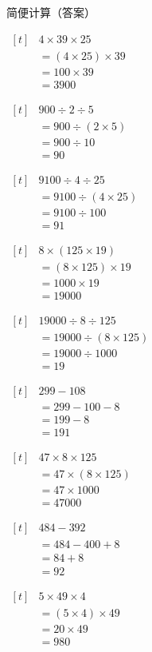 \documentclass[UTF8]{ctexart}
\newcommand{\sheettitle}[1]{%
  \begin{center}
    {\zihao{1} #1\par}
  \end{center}
  \vspace{8mm}%
}
\newcommand{\cell}[1]{%
  \begin{minipage}[t][49mm][t]{0.315\textwidth}%
    \vspace{0pt}%
    \linespread{1}\zihao{3}%
    #1%
  \end{minipage}%
}
\newcommand{\sheetrow}[3]{%
  \noindent\cell{#1}\hfill\cell{#2}\hfill\cell{#3}\par
  \nointerlineskip
}
\begin{document}
\sheettitle{简便计算（答案）}
\sheetrow
{\(\begin{aligned}[t]
& 4\times 39\times 25 \\
& = (4\times 25)\times 39 \\
& = 100\times 39 \\
& = 3900
\end{aligned}\)}
{\(\begin{aligned}[t]
& 900\div 2\div 5 \\
& = 900\div (2\times 5) \\
& = 900\div 10 \\
& = 90
\end{aligned}\)}
{\(\begin{aligned}[t]
& 9100\div 4\div 25 \\
& = 9100\div (4\times 25) \\
& = 9100\div 100 \\
& = 91
\end{aligned}\)}
\sheetrow
{\(\begin{aligned}[t]
& 8\times (125\times 19) \\
& = (8\times 125)\times 19 \\
& = 1000\times 19 \\
& = 19000
\end{aligned}\)}
{\(\begin{aligned}[t]
& 19000\div 8\div 125 \\
& = 19000\div (8\times 125) \\
& = 19000\div 1000 \\
& = 19
\end{aligned}\)}
{\(\begin{aligned}[t]
& 299-108 \\
& = 299-100-8 \\
& = 199-8 \\
& = 191
\end{aligned}\)}
\sheetrow
{\(\begin{aligned}[t]
& 47\times 8\times 125 \\
& = 47\times (8\times 125) \\
& = 47\times 1000 \\
& = 47000
\end{aligned}\)}
{\(\begin{aligned}[t]
& 484-392 \\
& = 484-400+8 \\
& = 84+8 \\
& = 92
\end{aligned}\)}
{\(\begin{aligned}[t]
& 5\times 49\times 4 \\
& = (5\times 4)\times 49 \\
& = 20\times 49 \\
& = 980
\end{aligned}\)}
\end{document}
